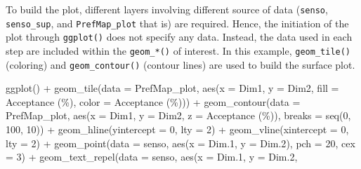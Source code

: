 \documentclass[
]{krantz}
\makeatletter
\newenvironment{Shaded}{\begin{snugshade}}{\end{snugshade}}
\newcommand{\AttributeTok}[1]{\textcolor[rgb]{0.61,0.61,0.61}{#1}}
\newcommand{\DecValTok}[1]{\textcolor[rgb]{0.06,0.06,0.06}{#1}}
\newcommand{\FloatTok}[1]{\textcolor[rgb]{0.06,0.06,0.06}{#1}}
\newcommand{\FunctionTok}[1]{\textcolor[rgb]{0,0,0}{#1}}
\newcommand{\NormalTok}[1]{#1}
\newcommand{\SpecialCharTok}[1]{\textcolor[rgb]{0,0,0}{#1}}
\newcommand{\StringTok}[1]{\textcolor[rgb]{0.5,0.5,0.5}{#1}}
\newenvironment{kframe}{%
\medskip{}
\setlength{\fboxsep}{.8em}
 \def\at@end@of@kframe{}%
 \ifinner\ifhmode%
  \def\at@end@of@kframe{\end{minipage}}%
  \begin{minipage}{\columnwidth}%
 \fi\fi%
 \def\FrameCommand##1{\hskip\@totalleftmargin \hskip-\fboxsep
 \colorbox{shadecolor}{##1}\hskip-\fboxsep
     \hskip-\linewidth \hskip-\@totalleftmargin \hskip\columnwidth}%
 \MakeFramed {\advance\hsize-\width
   \@totalleftmargin\z@ \linewidth\hsize
   \@setminipage}}%
 {\par\unskip\endMakeFramed%
 \at@end@of@kframe}
\renewenvironment{Shaded}{\begin{kframe}}{\end{kframe}}
\makeatother
\begin{document}
To build the plot, different layers involving different source of data (\texttt{senso}, \texttt{senso\_sup}, and \texttt{PrefMap\_plot} that is) are required. Hence, the initiation of the plot through \texttt{ggplot()} does not specify any data. Instead, the data used in each step are included within the \texttt{geom\_*()} of interest. In this example, \texttt{geom\_tile()} (coloring) and \texttt{geom\_contour()} (contour lines) are used to build the surface plot.

\begin{Shaded}
\begin{Highlighting}[]
\FunctionTok{ggplot}\NormalTok{() }\SpecialCharTok{+}
  \FunctionTok{geom\_tile}\NormalTok{(}\AttributeTok{data =}\NormalTok{ PrefMap\_plot, }\FunctionTok{aes}\NormalTok{(}\AttributeTok{x =}\NormalTok{ Dim1, }\AttributeTok{y =}\NormalTok{ Dim2, }
                                     \AttributeTok{fill =} \StringTok{\textasciigrave{}}\AttributeTok{Acceptance (\%)}\StringTok{\textasciigrave{}}\NormalTok{, }
                                     \AttributeTok{color =} \StringTok{\textasciigrave{}}\AttributeTok{Acceptance (\%)}\StringTok{\textasciigrave{}}\NormalTok{)) }\SpecialCharTok{+}
  \FunctionTok{geom\_contour}\NormalTok{(}\AttributeTok{data =}\NormalTok{ PrefMap\_plot, }\FunctionTok{aes}\NormalTok{(}\AttributeTok{x =}\NormalTok{ Dim1, }\AttributeTok{y =}\NormalTok{ Dim2, }
                                        \AttributeTok{z =} \StringTok{\textasciigrave{}}\AttributeTok{Acceptance (\%)}\StringTok{\textasciigrave{}}\NormalTok{), }
               \AttributeTok{breaks =} \FunctionTok{seq}\NormalTok{(}\DecValTok{0}\NormalTok{, }\DecValTok{100}\NormalTok{, }\DecValTok{10}\NormalTok{)) }\SpecialCharTok{+}
  \FunctionTok{geom\_hline}\NormalTok{(}\AttributeTok{yintercept =} \DecValTok{0}\NormalTok{, }\AttributeTok{lty =} \DecValTok{2}\NormalTok{) }\SpecialCharTok{+}
  \FunctionTok{geom\_vline}\NormalTok{(}\AttributeTok{xintercept =} \DecValTok{0}\NormalTok{, }\AttributeTok{lty =} \DecValTok{2}\NormalTok{) }\SpecialCharTok{+}
  \FunctionTok{geom\_point}\NormalTok{(}\AttributeTok{data =}\NormalTok{ senso, }\FunctionTok{aes}\NormalTok{(}\AttributeTok{x =}\NormalTok{ Dim}\FloatTok{.1}\NormalTok{, }\AttributeTok{y =}\NormalTok{ Dim}\FloatTok{.2}\NormalTok{), }
             \AttributeTok{pch =} \DecValTok{20}\NormalTok{, }\AttributeTok{cex =} \DecValTok{3}\NormalTok{) }\SpecialCharTok{+}
  \FunctionTok{geom\_text\_repel}\NormalTok{(}\AttributeTok{data =}\NormalTok{ senso, }\FunctionTok{aes}\NormalTok{(}\AttributeTok{x =}\NormalTok{ Dim}\FloatTok{.1}\NormalTok{, }\AttributeTok{y =}\NormalTok{ Dim}\FloatTok{.2}\NormalTok{, }

\end{Highlighting}
\end{Shaded}
\end{document}
